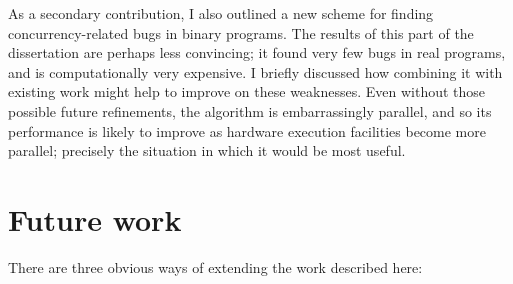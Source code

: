 As a secondary contribution, I also outlined a new scheme for finding
concurrency-related bugs in binary programs.  The results of this part
of the dissertation are perhaps less convincing; it found very few
bugs in real programs, and is computationally very expensive.  I
briefly discussed how combining it with existing work might help to
improve on these weaknesses.  Even without those possible future
refinements, the algorithm is embarrassingly parallel, and so its
performance is likely to improve as hardware execution facilities
become more parallel; precisely the situation in which it would be
most useful.

\section{Future work}

There are three obvious ways of extending the work described here:


